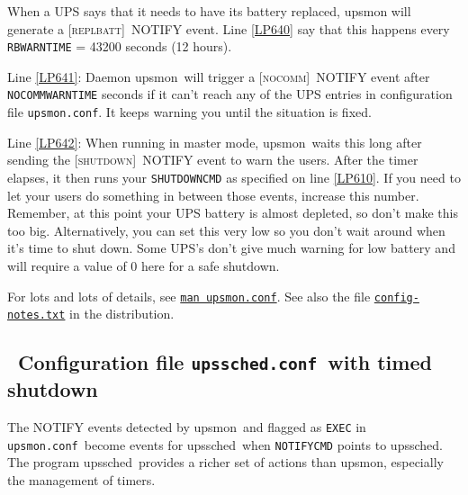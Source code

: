 \documentclass[12pt]{article}
\newlength{\headersep}\setlength{\headersep}{3mm}
\newcommand{\Hsep}{\hspace{\headersep}}
\newcommand{\upsmon}{\mbox{\textcolor{MONCOLOUR}{upsmon}}}
\newcommand{\upssched}{\mbox{\textcolor{SCHEDCOLOUR}{upssched}}}
\newcommand{\SHUTDOWN}{\textcolor{MONCOLOUR}{\textsc{shutdown}}}
\newcommand{\REPLBATT}{\textcolor{MONCOLOUR}{\textsc{replbatt}}}
\newcommand{\NOCOMM}{\textcolor{MONCOLOUR}{\textsc{nocomm}}}
\newcommand{\NOTev}[1]{\textcolor{MONCOLOUR}{[{#1}]}}
\newcommand{\upsmonconf}{\textcolor{MONCOLOUR}{\texttt{upsmon.conf}}}
\newcommand{\upsschedconf}{\textcolor{SCHEDCOLOUR}{\texttt{upssched.conf}}}
\newcommand{\NUTman}[1]{\href{http://networkupstools.org/docs/man/#1.html}{\texttt{man #1}}}
\begin{document}
When a UPS says that it needs to have its battery replaced, upsmon will
generate a \NOTev{\REPLBATT}\ NOTIFY event.  Line \ref{LP640} say that this happens
every \texttt{RBWARNTIME} = 43200 seconds (12 hours).

Line \ref{LP641}: Daemon \upsmon\ will trigger a \NOTev{\NOCOMM}\ NOTIFY event after
\texttt{NOCOMMWARNTIME} seconds if it can't reach any of the UPS entries in
configuration file \upsmonconf.  It keeps warning you until the situation is
fixed.

Line \ref{LP642}: When running in master mode, \upsmon\ waits this long after
sending the \NOTev{\SHUTDOWN}\ NOTIFY event to warn the users. After the timer
elapses, it then runs your \texttt{SHUTDOWNCMD} as specified on line
\ref{LP610}.  If you need to let your users do something in between those
events, increase this number. Remember, at this point your UPS battery is
almost depleted, so don't make this too big.  Alternatively, you can set this
very low so you don't wait around when it's time to shut down. Some UPS's
don't give much warning for low battery and will require a value of 0 here for
a safe shutdown.

For lots and lots of details, see \NUTman{upsmon.conf}.  See also the file
\href{https://github.com/networkupstools/nut/blob/master/docs/config-notes.txt}
     {\texttt{config{\allowbreak}-notes.txt}} in the distribution.


\subsection{\Hsep\ Configuration file \upsschedconf\ with timed shutdown}\label{section:upsschedconf.bad}

The NOTIFY events detected by \upsmon\ and flagged as \texttt{EXEC} in
\upsmonconf\ become events for \upssched\ when \texttt{NOTIFYCMD} points to
\upssched.  The program \upssched\ provides a richer set of actions than
\upsmon, especially the management of timers.
\end{document}
